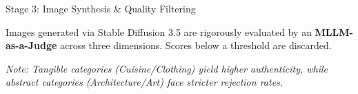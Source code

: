 \documentclass[aspectratio=169]{beamer}
\begin{document}
\begin{frame}{Stage 3: Image Synthesis \& Quality Filtering}
  
  Images generated via Stable Diffusion 3.5 are rigorously evaluated by an \textbf{MLLM-as-a-Judge} across three dimensions. Scores below a threshold are discarded.
  
  \vspace{0.3cm}
  \begin{table}
    \centering
    \caption{Image Quality Scores (MLLM-as-a-Judge) \& Pass Rates}
  \end{table}
  
  \vspace{0.2cm}
  \small \textit{Note: Tangible categories (Cuisine/Clothing) yield higher authenticity, while abstract categories (Architecture/Art) face stricter rejection rates.}
\end{frame}
\end{document}
